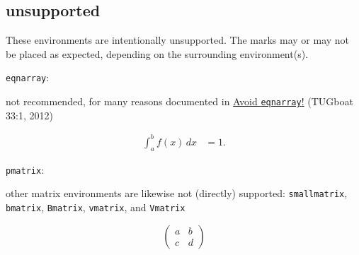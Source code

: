 \documentclass[leqno]{article}
\newcommand{\testtype}[2]{\texttt{#1}:%
  #2}
\newcommand{\makeoutertest}[3]{
  \begin{test}
    \testtype{#1}{#2}
    #3
  \end{test}
}
\newcommand{\maketest}[3]{
  \makeoutertest{#1}{#2}{
    \begin{#1}
      #3
    \end{#1}
  }
}
\begin{document}
\subsection{unsupported}

These environments are intentionally unsupported.
The marks may or may not be placed as expected, depending on the surrounding environment(s).

\maketest{eqnarray}{
  not recommended, for many reasons documented in
  \href{https://tug.org/TUGboat/tb33-1/tb103madsen.pdf}{Avoid \texttt{eqnarray}!} (TUGboat 33:1, 2012)
}{
  \int_a^b f(x)\, dx & = 1.
}

\makeoutertest{pmatrix}{
  other matrix environments are likewise not (directly) supported: \texttt{smallmatrix}, \texttt{bmatrix}, \texttt{Bmatrix}, \texttt{vmatrix}, and \texttt{Vmatrix}}{
  \[\begin{pmatrix}
    a&b\\ c&d
  \end{pmatrix}\]
}
\end{document}
